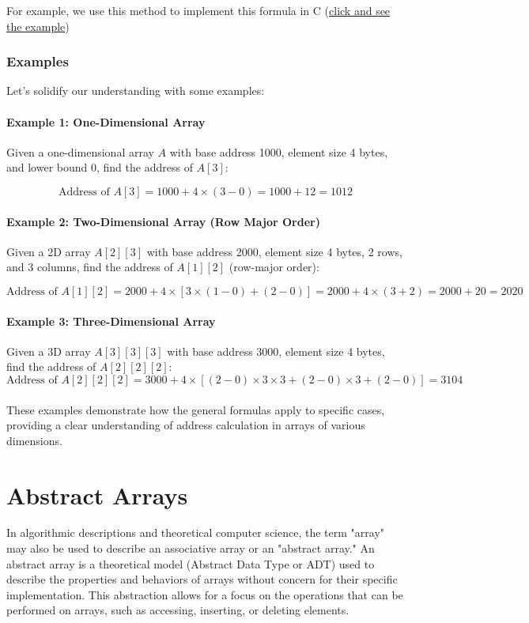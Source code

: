 \documentclass[12pt, oneside]{book}
\begin{document}
For example, we use this method to implement this formula in C (\href{https://github.com/m-mdy-m/Arliz/blob/main/AddressCalculation/4D-Dimensional.c}{click and see the example})

\subsubsection{Examples}

Let’s solidify our understanding with some examples:

\paragraph{Example 1: One-Dimensional Array}
Given a one-dimensional array \( A \) with base address 1000, element size 4 bytes, and lower bound 0, find the address of \( A[3] \):

\[
\text{Address of } A[3] = 1000 + 4 \times (3 - 0) = 1000 + 12 = 1012
\]

\paragraph{Example 2: Two-Dimensional Array (Row Major Order)}
Given a 2D array \( A[2][3] \) with base address 2000, element size 4 bytes, 2 rows, and 3 columns, find the address of \( A[1][2] \) (row-major order):

\[
\text{Address of } A[1][2] = 2000 + 4 \times \left[ 3 \times (1 - 0) + (2 - 0) \right] = 2000 + 4 \times (3 + 2) = 2000 + 20 = 2020
\]

\paragraph{Example 3: Three-Dimensional Array}
Given a 3D array \( A[3][3][3] \) with base address 3000, element size 4 bytes, find the address of \( A[2][2][2] \):
\[\text{Address of } A[2][2][2] = 3000 + 4 \times \left[ (2 - 0) \times 3 \times 3 + (2 - 0) \times 3 + (2 - 0) \right] = 3104\]\\
These examples demonstrate how the general formulas apply to specific cases, providing a clear understanding of address calculation in arrays of various dimensions.



\section{Abstract Arrays}
In algorithmic descriptions and theoretical computer science, the term "array" may also be used to describe an associative array or an "abstract array." An abstract array is a theoretical model (Abstract Data Type or ADT) used to describe the properties and behaviors of arrays without concern for their specific implementation. This abstraction allows for a focus on the operations that can be performed on arrays, such as accessing, inserting, or deleting elements.
\end{document}
